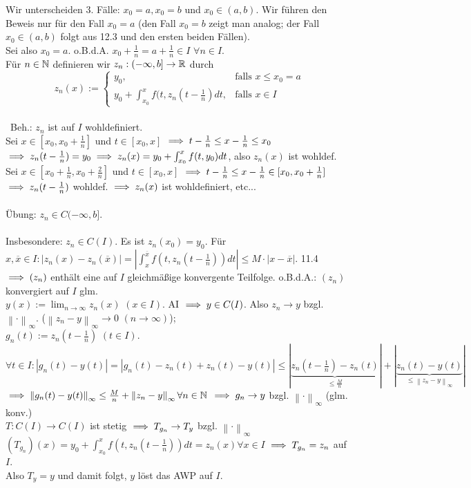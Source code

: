 \documentclass[a4paper,twoside,DIV15,BCOR12mm]{scrbook}
\begin{document}
\begin{beweis}[Nr.2]
Wir unterscheiden 3. Fälle: $x_0 = a, x_0 = b$ und $x_0 \in (a,b)$. Wir führen den Beweis nur für den Fall $x_0 = a$ (den Fall $x_0 = b$ zeigt man analog; 
der Fall $x_0 \in (a,b) $ folgt aus 12.3 und den ersten beiden Fällen). \\ Sei also $x_0 = a$. o.B.d.A. $x_0+\frac{1}{n}=a+\frac{1}{n} \in I$ $\forall n \in I$. \\
Für $n \in \mathbb{N}$ definieren wir $z_n : (-\infty,b] \to \mathbb{R}$ durch 
$$z_n(x):=
\begin{cases}
y_0, & \text{falls } x \leq x_0 = a  \\
y_0 +\int_{x_0}^{x}f(t,z_n(t-\frac{1}{n}) dt, & \text{falls } x \in I
\end{cases}$$\\\
Beh.: $z_n$ ist auf $I$ wohldefiniert.\\
Sei $x \in [x_0, x_0+\frac{1}{n}]$ und $ t \in [x_0, x]$ $\implies t-\frac{1}{n} \leq x-\frac{1}{n} \leq x_0$
$\implies z_n(t-\frac{1}{n}) = y_0 \implies z_n(x) = y_0 + \int_{x_0}^{x}f(t,y_0) dt$, also $z_n(x)$ ist wohldef.\\
Sei $x \in [x_0+\frac{1}{n},x_0+\frac{2}{n}]$ und $t \in [x_0,x]$ $\implies t-\frac{1}{n} \leq x-\frac{1}{n} \in [x_0, x_0+\frac{1}{n}]$
$\implies z_n(t-\frac{1}{n})$ wohldef. $\implies z_n(x)$ ist wohldefiniert, etc... \\\\
Übung: $z_n \in C(-\infty, b]$. \\\\
Insbesondere: $z_n \in C(I)$. Es ist $z_n(x_0) = y_0$. Für $x,\overline{x} \in I: 
|z_n(x)-z_n(\overline{x})| = | \int_{x}^{\overline{x}}f(t,z_n(t-\frac{1}{n})) dt | \leq M \cdot |x-\overline{x}|.$ 
11.4 $\implies (z_n)$ enthält eine auf $I$ gleichmäßige konvergente Teilfolge. o.B.d.A.: $(z_n)$ konvergiert auf $I$ glm. \\
$y(x):= \lim_{n \to \infty} z_n(x)$ $(x \in I)$. AI $\implies y \in C(I)$. Also $z_n \to y$ bzgl. $\left\|\cdot\right\|_{\infty}$. 
($\left\|z_n-y\right\|_{\infty} \to 0$ $( n \to \infty ) $); \\ $g_n(t) := z_n(t-\frac{1}{n})$ $(t \in I)$. 
$\forall t \in I : |g_n(t)-y(t)| = | g_n(t)-z_n(t)+z_n(t)-y(t) | \leq |\underbrace{z_n(t-\frac{1}{n})-z_n(t)}_{\leq \frac{M}{n}}|+|\underbrace{z_n(t)-y(t)}_{\leq \left\|z_n-y \right\|_{\infty}} |$\\
$\implies \left\| g_n(t) - y(t) \right\|_{\infty} \leq \frac{M}{n} +\left\|z_n-y \right\|_{\infty} \forall n \in \mathbb{N}$
$\implies g_n \to y $ bzgl. $\left\|\cdot\right\|_{\infty}$ (glm. konv.) \\
$T: C(I) \to C(I)$ ist stetig $\implies T_{g_n} \to T_y $ bzgl. $\left\|\cdot\right\|_{\infty}$ \\
$(T_{g_n})(x) = y_0 + \int_{x_0}^{x}f(t,z_n(t-\frac{1}{n})) dt = z_n(x) \forall x \in I$ 
$\implies T_{g_n}=z_n$ auf $I$. \\ Also $T_y = y$ und damit folgt, $y$ löst das AWP auf $I$.
\end{beweis}
\end{document}
